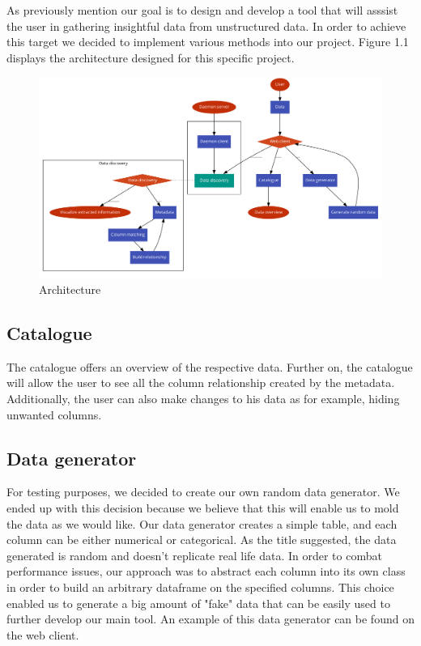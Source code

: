 As previously mention our goal is to design and develop a tool that will asssist the user in gathering insightful data from unstructured data.
In order to achieve this target we decided to implement various methods into our project. Figure 1.1 displays the architecture designed for this specific project.  
\begin {figure} [h]
    \centering
    \includegraphics[width=16cm]{figures/architecture}
    \caption {Architecture}
    \label {fig:architecture_diagram}
\end{figure}
\vspace{5mm} %
\subsection{Catalogue}
The catalogue offers an overview of the respective data. Further on, the catalogue will allow the user to see all the column relationship created by the metadata. Additionally, the user can also make changes to his data as for example, hiding unwanted columns.
\vspace{5mm} %
\subsection{Data generator}
For testing purposes, we decided to create our own random data generator. We ended up with this decision because we believe that this will enable us to mold the data as we would like. Our data generator creates a simple table, and each column can be either numerical or categorical. As the title suggested, the data generated is random and doesn't replicate real life data. In order to combat performance issues, our approach was to abstract each column into its own class in order to build an arbitrary dataframe
on the specified columns. This choice enabled us to generate a big amount of "fake" data that can be easily used to further develop our main tool. An example of this data generator can be found on the web client.
\vspace{5mm} %
